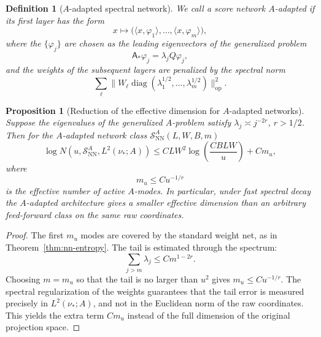 \documentclass{article}
\newtheorem{proposition}[theorem]{Proposition}
\newtheorem{definition}[theorem]{Definition}
\newcommand{\Asf}{\mathsf A}
\begin{document}
\begin{definition}[\(A\)-adapted spectral network]
\label{def:A-spectral-network}
We call a score network \(A\)-adapted if its first layer has the form
\[
        x\mapsto \bigl(\langle x,\varphi_1\rangle,\dots,
        \langle x,\varphi_m\rangle\bigr),
\]
where the \(\{\varphi_j\}\) are chosen as the leading eigenvectors of the
generalized problem
\[
        \Asf_*\varphi_j=\lambda_jQ\varphi_j,
\]
and the weights of the subsequent layers are penalized by the spectral norm
\[
        \sum_{\ell}\|W_\ell\operatorname{diag}(\lambda_1^{1/2},\dots,
        \lambda_m^{1/2})\|_{\mathrm{op}}^2 .
\]
\end{definition}

\begin{proposition}[Reduction of the effective dimension for \(A\)-adapted networks]
\label{prop:A-adapted-network}
Suppose the eigenvalues of the generalized \(A\)-problem satisfy
\(\lambda_j\asymp j^{-2r}\), \(r>1/2\). Then for the \(A\)-adapted network class
\(\mathcal S_{\mathrm{NN}}^A(L,W,B,m)\)
\[
        \log N(u,\mathcal S_{\mathrm{NN}}^A,L^2(\nu_*;A))
        \le
        C LW^2
        \log\left(\frac{CBLW}{u}\right)
        +C m_u,
\]
where
\[
        m_u\le C u^{-1/r}
\]
is the effective number of active \(A\)-modes. In particular, under fast spectral
decay the \(A\)-adapted architecture gives a smaller effective dimension than an
arbitrary feed-forward class on the same raw coordinates.
\end{proposition}

\begin{proof}
The first \(m_u\) modes are covered by the standard weight net, as in
Theorem~\ref{thm:nn-entropy}. The tail is estimated through the spectrum:
\[
        \sum_{j>m}\lambda_j\le C m^{1-2r}.
\]
Choosing \(m=m_u\) so that the tail is no larger than \(u^2\) gives
\(m_u\le C u^{-1/r}\). The spectral regularization of the weights guarantees that
the tail error is measured precisely in \(L^2(\nu_*;A)\), and not in the Euclidean
norm of the raw coordinates. This yields the extra term \(Cm_u\) instead of the
full dimension of the original projection space.
\end{proof}
\end{document}
